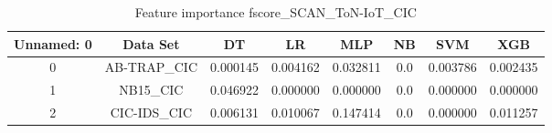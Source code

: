 \begin{table}[H]
\centering
\caption{Feature importance fscore_SCAN_ToN-IoT_CIC}
\label{fscore_SCAN_ToN-IoT_CIC}
\begin{tabular}{cccccccc}
\toprule
 Unnamed: 0 &    Data Set &       DT &       LR &      MLP &  NB &      SVM &      XGB \\
\midrule
          0 & AB-TRAP\_CIC & 0.000145 & 0.004162 & 0.032811 & 0.0 & 0.003786 & 0.002435 \\
          1 &    NB15\_CIC & 0.046922 & 0.000000 & 0.000000 & 0.0 & 0.000000 & 0.000000 \\
          2 & CIC-IDS\_CIC & 0.006131 & 0.010067 & 0.147414 & 0.0 & 0.000000 & 0.011257 \\
\bottomrule
\end{tabular}
\end{table}
